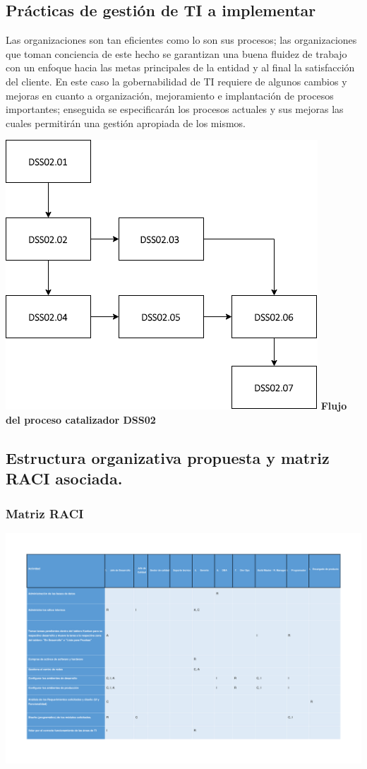 \documentclass[conference]{IEEEtran}
\begin{document}
\subsection{Prácticas de gestión de TI a implementar}

Las organizaciones son tan eficientes como lo son sus procesos; las organizaciones que toman conciencia de este hecho se garantizan una buena fluidez de trabajo con un enfoque hacia las metas principales de la entidad y al final la satisfacción del cliente. En este caso la gobernabilidad de TI requiere de algunos cambios y mejoras en cuanto a organización, mejoramiento e implantación de procesos importantes; enseguida se especificarán los procesos actuales y sus mejoras las cuales permitirán una gestión apropiada de los mismos.

    \begin{center}
    \end{center}
    \begin{center}
        \includegraphics[width=.5\textwidth]{Imagenes/Flujo del proceso catalizador DSS02.png}
        \textbf {Flujo del proceso catalizador DSS02}
    \end{center}
    
\subsection{Estructura organizativa propuesta y matriz RACI asociada.}

\subsubsection{Matriz RACI}

    \begin{center}
        \includegraphics[width=.5\textwidth]{Documentos/Matriz RACI 02.pdf}
    \end{center}
\end{document}
